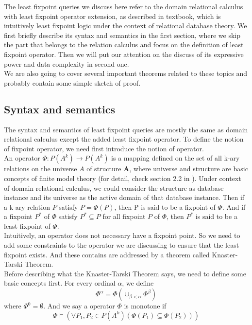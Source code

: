 The least fixpoint queries we discuss here refer to the domain relational calculus with least fixpoint operator extension, as described in textbook\cite{Abiteboul1}, which is intuitively least fixpoint logic under the context of relational database theory. We first briefly describe its syntax and semantics in the first section, where we skip the part that belongs to the relation calculus and focus on the definition of least fixpoint operator. Then we will put our attention on the discuss of its expressive power and data complexity in second one. \\
We are also going to cover several important theorems related to these topics and probably contain some simple sketch of proof.

\subsection{Syntax and semantics}
The syntax and semantics of least fixpoint queries are mostly the same as domain relational calculus except the added least fixpoint operator. To define the notion of fixpoint operator, we need first introduce the notion of operator. \\
An operator $\Phi: \textit{P}(A^k)\rightarrow \textit{P}(A^k)$ is a mapping defined on the set of all k-ary relations on the universe $A$ of structure $\textbf{A}$, where universe and structure are basic concepts of finite model theory (for detail, check section 2.2 in \cite{kolaitis1}). Under context of domain relational calculus, we could consider the structure as database instance and its universe as the active domain of that database instance. Then if a k-ary relation $P$ satisfy $P=\Phi(P)$, then P is said to be a fixpoint of $\Phi$. And if a fixpoint $P^*$ of $\Phi$ satisfy $P^*\subseteq P$ for all fixpoint $P$ of $\Phi$, then $P^*$ is said to be a least fixpoint of $\Phi$.\\
Intuitively, an operator does not necessary have a fixpoint point. So we need to add some constraints to the operator we are discussing to ensure that the least fixpoint exists. And these contains are addressed by a theorem called Knaster-Tarski Theorem\cite{Tarski}. \\
Before describing what the Knaster-Tarski Theorem says, we need to define some basic concepts first. For every ordinal $\alpha$, we define 
$$\Phi^{\alpha}=\Phi(\cup_{\beta<\alpha} \Phi^{\beta})$$
where $\Phi^0=\emptyset$. And we say a operator $\Phi$ is monotone if 
$$\Phi\models(\forall P_1,P_2\in P(A^k)(\Phi(P_1)\subseteq\Phi(P_2)))$$
